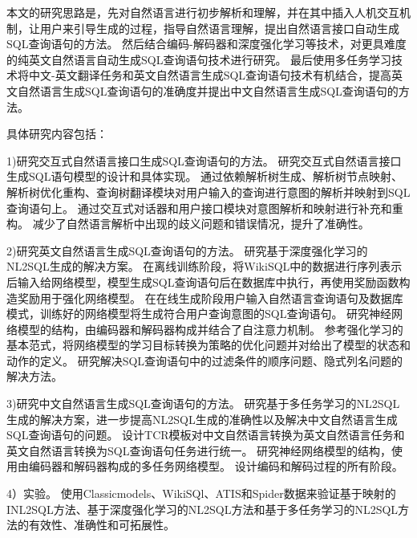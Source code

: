 
本文的研究思路是，先对自然语言进行初步解析和理解，并在其中插入人机交互机制，让用户来引导生成的过程，指导自然语言理解，提出自然语言接口自动生成SQL查询语句的方法。
然后结合编码-解码器和深度强化学习等技术，对更具难度的纯英文自然语言自动生成SQL查询语句技术进行研究。
最后使用多任务学习技术将中文-英文翻译任务和英文自然语言生成SQL查询语句技术有机结合，提高英文自然语言生成SQL查询语句的准确度并提出中文自然语言生成SQL查询语句的方法。

具体研究内容包括：

1)研究交互式自然语言接口生成SQL查询语句的方法。
研究交互式自然语言接口生成SQL语句模型的设计和具体实现。
通过依赖解析树生成、解析树节点映射、解析树优化重构、查询树翻译模块对用户输入的查询进行意图的解析并映射到SQL查询语句上。
通过交互式对话器和用户接口模块对意图解析和映射进行补充和重构。
减少了自然语言解析中出现的歧义问题和错误情况，提升了准确性。


2)研究英文自然语言生成SQL查询语句的方法。
研究基于深度强化学习的NL2SQL生成的解决方案。
在离线训练阶段，将WikiSQL中的数据进行序列表示后输入给网络模型，模型生成SQL查询语句后在数据库中执行，再使用奖励函数构造奖励用于强化网络模型。
在在线生成阶段用户输入自然语言查询语句及数据库模式，训练好的网络模型将生成符合用户查询意图的SQL查询语句。
研究神经网络模型的结构，由编码器和解码器构成并结合了自注意力机制。
参考强化学习的基本范式，将网络模型的学习目标转换为策略的优化问题并对给出了模型的状态和动作的定义。
研究解决SQL查询语句中的过滤条件的顺序问题、隐式列名问题的解决方法。

3)研究中文自然语言生成SQL查询语句的方法。
研究基于多任务学习的NL2SQL生成的解决方案，进一步提高NL2SQL生成的准确性以及解决中文自然语言生成SQL查询语句的问题。
设计TCR模板对中文自然语言转换为英文自然语言任务和英文自然语言转换为SQL查询语句任务进行统一。
研究神经网络模型的结构，使用由编码器和解码器构成的多任务网络模型。
设计编码和解码过程的所有阶段。

4）实验。
使用Classicmodels、WikiSQl、ATIS和Spider数据来验证基于映射的INL2SQL方法、基于深度强化学习的NL2SQL方法和基于多任务学习的NL2SQL方法的有效性、准确性和可拓展性。


